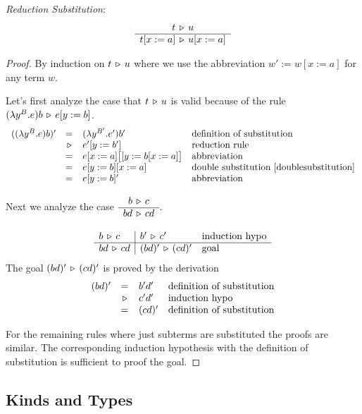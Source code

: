 \documentclass[12pt]{article}
\begin{document}
\begin{lemma}
  \label{reductionsubstitution}
  \emph{Reduction Substitution}:
  $$
  \begin{array}{c} t \,\triangleright\, u
   \\ \hline t[x:=a] \,\triangleright\, u[x:=a]\end{array}
  $$
  \begin{proof} By induction on $t \,\triangleright\, u$ where we use the abbreviation
    $w' := w[x:=a]$ for any term $w$.

    Let's first analyze the case that $t \,\triangleright\, u$ is valid because of the
    rule $(\lambda y^B.e) b \,\triangleright\, e[y:=b]$.
    $$
    \begin{array}{llll}
      ((\lambda y^B.e) b)'
      &=& (\lambda y^{B'}. e') b'
      &\text{definition of substitution}
      \\
      &\,\triangleright\, & e'[y:=b'] &\text{reduction rule}
      \\
      &=& e[x:=a]\big[[y:=b[x:=a]\big]   &\text{abbreviation}
      \\
      &=& e[y:=b][x:=a]
      &\text{double substitution~\ref{doublesubstitution}}
      \\
      &=& e[y:=b]'  &\text{abbreviation}
    \end{array}
    $$

    Next we analyze the case $\begin{array}{c} b \,\triangleright\, c \\ \hline bd \,\triangleright\, cd\end{array}$.

    $$
    \begin{array}{l|ll}
      b \,\triangleright\, c    & b' \,\triangleright\, c' & \text{induction hypo}
      \\ \hline
      bd \,\triangleright\, cd  & (bd)' \,\triangleright\, (cd)' & \text{goal}
    \end{array}
    $$
    The goal $(bd)' \,\triangleright\, (cd)'$ is proved by the derivation
    $$
    \begin{array}{llll}
      (bd)'
      &=& b' d'        &\text{definition of substitution}
      \\
      &\,\triangleright\,& c' d'  &\text{induction hypo}
      \\
      &=& (cd)'        &\text{definition of substitution}
    \end{array}
    $$

    For the remaining rules where just subterms are substituted the proofs are
    similar. The corresponding induction hypothesis with the definition of
    substitution is sufficient to proof the goal.
  \end{proof}
\end{lemma}


\subsection{Kinds and Types}
\end{document}

